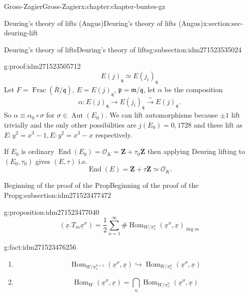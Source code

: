 \documentclass[oneside,10pt,]{book}
\numberwithin{equation}{section}
\newcommand{\ideal}[1]{\mathfrak{#1}}
\newcommand{\ZZ}{\mathbf{Z}}
\newcommand{\ints}{\mathcal{O}}
\DeclareMathOperator{\End}{End}
\DeclareMathOperator{\Hom}{Hom}
\DeclareMathOperator{\Aut}{Aut}
\DeclareMathOperator{\Frac}{Frac}
\begin{document}
\begin{chapterptx}{Gross-Zagier}{}{Gross-Zagier}{}{}{x:chapter:chapter-buntes-gz}
\begin{sectionptx}{Deuring's theory of lifts (Angus)}{}{Deuring's theory of lifts (Angus)}{}{}{x:section:sec-deuring-lift}
\begin{subsectionptx}{Deuring's theory of lifts}{}{Deuring's theory of lifts}{}{}{g:subsection:idm271523535024}
\begin{proofptx}{}{g:proof:idm271523505712}
\begin{equation*}
E(j)_{\ideal q} \simeq E(j_i)_{\ideal q}
\end{equation*}
Let \(F = \Frac (\overline R/\ideal q)\), \(E = E(j)_{\ideal q}\), \(\ideal p = \ideal m /\ideal q\), let \(\alpha \) be the composition%
\begin{equation*}
\alpha  \colon E(j)_{\ideal q} \to E(j_i)_{\ideal q} \xrightarrow\sim E(j)_{\ideal q}\text{.}
\end{equation*}
So \(\alpha  \equiv  \alpha _0 \circ \sigma\) for \(\sigma  \in \Aut(E_0)\). We can lift automorphisms because \(\pm1 \) lift trivially and the only other possibilities are \(j(E_0) = 0,1728\) and these lift as \(E\colon y^2 = x^3 - 1,E\colon y^2 = x^3-x\) respectively.%
\end{proofptx}
If \(E_0\) is ordinary \(\End(E_0) = \ints_K = \ZZ+ \tau _0\ZZ\) then applying Deuring lifting to \((E_0, \tau _0)\) gives \((E, \tau )\) i.e.%
\begin{equation*}
\End(E) = \ZZ+ \tau  \ZZ \simeq \ints_K\text{.}
\end{equation*}
%
\end{subsectionptx}
%
%
\typeout{************************************************}
\typeout{************************************************}
%
\begin{subsectionptx}{Beginning of the proof of the Prop}{}{Beginning of the proof of the Prop}{}{}{g:subsection:idm271523477472}
\begin{proposition}{}{}{g:proposition:idm271523477040}%
%
\begin{equation*}
(\underline x. T_m \underline x^\sigma ) = \frac12 \sum_{n=1}^\infty  \#\Hom_{W/\pi _v^n}(\underline x^\sigma , \underline x)_{\deg m}
\end{equation*}
%
\end{proposition}
\begin{fact}{}{}{g:fact:idm271523476256}%
%
\begin{enumerate}
\item{}%
\begin{equation*}
\Hom_{W/\pi _v^{n+1}}(\underline x^\sigma , \underline x) \hookrightarrow \Hom_{W/\pi _v^n}(\underline x^\sigma , \underline x)
\end{equation*}
%
\item{}%
\begin{equation*}
\Hom_{W}(\underline x^\sigma , \underline x) = \bigcap_n \Hom_{W/\pi _v^n}(\underline x^\sigma , \underline x)

\end{equation*}
\end{enumerate}
\end{fact}
\end{subsectionptx}
\end{sectionptx}
\end{chapterptx}
\end{document}
